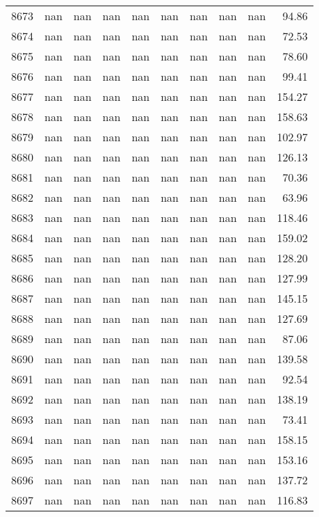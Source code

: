 \begin{tabular}{lrrrrrrrrr}
8673 & nan & nan & nan & nan & nan & nan & nan & nan & 94.86 \\
8674 & nan & nan & nan & nan & nan & nan & nan & nan & 72.53 \\
8675 & nan & nan & nan & nan & nan & nan & nan & nan & 78.60 \\
8676 & nan & nan & nan & nan & nan & nan & nan & nan & 99.41 \\
8677 & nan & nan & nan & nan & nan & nan & nan & nan & 154.27 \\
8678 & nan & nan & nan & nan & nan & nan & nan & nan & 158.63 \\
8679 & nan & nan & nan & nan & nan & nan & nan & nan & 102.97 \\
8680 & nan & nan & nan & nan & nan & nan & nan & nan & 126.13 \\
8681 & nan & nan & nan & nan & nan & nan & nan & nan & 70.36 \\
8682 & nan & nan & nan & nan & nan & nan & nan & nan & 63.96 \\
8683 & nan & nan & nan & nan & nan & nan & nan & nan & 118.46 \\
8684 & nan & nan & nan & nan & nan & nan & nan & nan & 159.02 \\
8685 & nan & nan & nan & nan & nan & nan & nan & nan & 128.20 \\
8686 & nan & nan & nan & nan & nan & nan & nan & nan & 127.99 \\
8687 & nan & nan & nan & nan & nan & nan & nan & nan & 145.15 \\
8688 & nan & nan & nan & nan & nan & nan & nan & nan & 127.69 \\
8689 & nan & nan & nan & nan & nan & nan & nan & nan & 87.06 \\
8690 & nan & nan & nan & nan & nan & nan & nan & nan & 139.58 \\
8691 & nan & nan & nan & nan & nan & nan & nan & nan & 92.54 \\
8692 & nan & nan & nan & nan & nan & nan & nan & nan & 138.19 \\
8693 & nan & nan & nan & nan & nan & nan & nan & nan & 73.41 \\
8694 & nan & nan & nan & nan & nan & nan & nan & nan & 158.15 \\
8695 & nan & nan & nan & nan & nan & nan & nan & nan & 153.16 \\
8696 & nan & nan & nan & nan & nan & nan & nan & nan & 137.72 \\
8697 & nan & nan & nan & nan & nan & nan & nan & nan & 116.83 \\

\end{tabular}
